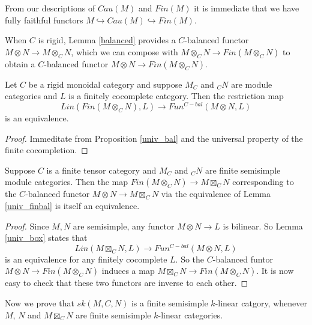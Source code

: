\begin{remark}

From our descriptions of $Cau(M)$ and $Fin(M)$ it is immediate that we have fully faithful functors $M\hookrightarrow Cau(M)\hookrightarrow Fin(M)$.\end{remark}

When $C$ is rigid, Lemma \ref{balanced} provides a $C$-balanced functor $M\otimes N \to M\otimes_C N$, which we can compose with $M\otimes_C N \to Fin(M\otimes_C N)$ to obtain a $C$-balanced functor $M\otimes N\to Fin(M\otimes_C N)$.

\begin{lemma}\label{univ_finbal}

Let $C$ be a rigid monoidal category and suppose $M_C$ and $_{C}N$ are module categories and $L$ is a finitely cocomplete category. Then the restriction map $$Lin(Fin(M\otimes_C N),L)\to Fun^{C-bal}(M\otimes N,L)$$ is an equivalence.\end{lemma}
\begin{proof}Immeditate from Proposition \ref{univ_bal} and the universal property of the finite cocompletion.\end{proof}

\begin{proposition}\label{fin_eq_bal}

Suppose $C$ is a finite tensor category and $M_C$ and $_{C}N$ are finite semisimple module categories. Then the map $Fin(M\otimes_C N)\to M\boxtimes_C N$ corresponding to the $C$-balanced functor $M\otimes N\to M\boxtimes_C N$ via the equivalence of Lemma \ref{univ_finbal} is itself an equivalence. \end{proposition}
\begin{proof} Since $M,N$ are semisimple, any functor $M\otimes N\to L$ is bilinear. So Lemma \ref{univ_box} states that \[Lin(M \boxtimes_{C} N, L) \to Fun^{C-bal}(M \otimes N, L)\] is an equivalence for any finitely cocomplete $L$. So the $C$-balanced funtor $M\otimes N\to Fin(M\otimes_C N)$ induces a map $M\boxtimes_C N\to Fin(M\otimes_C N)$. It is now easy to check that these two functors are inverse to each other. \end{proof}

Now we prove that $sk(M,C,N)$ is a finite semisimple $k$-linear catgory, whenever $M$, $N$ and $M\boxtimes_C N$ are finite semisimple $k$-linear categories.

